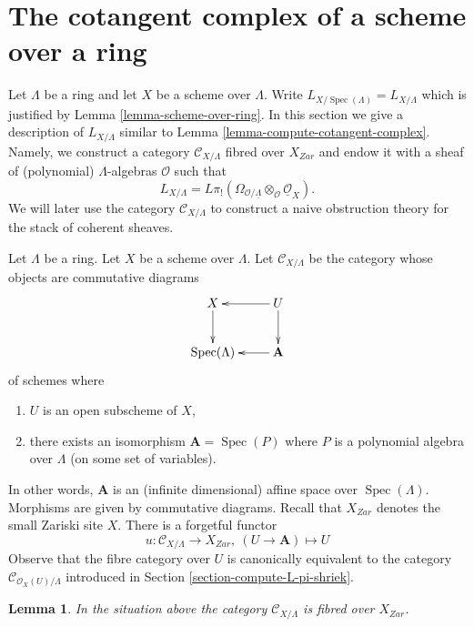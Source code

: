 \documentclass{stacks-project}
\theoremstyle{plain}
\newtheorem{lemma}[subsection]{Lemma}
\theoremstyle{definition}
\theoremstyle{remark}
\numberwithin{equation}{subsection}
\def\Spec{\mathop{\mathrm{Spec}}}
\begin{document}
\section{The cotangent complex of a scheme over a ring}
\label{section-cotangent-schemes-variant}

\noindent
Let $\Lambda$ be a ring and let $X$ be a scheme over $\Lambda$.
Write $L_{X/\Spec(\Lambda)} = L_{X/\Lambda}$ which is justified
by Lemma \ref{lemma-scheme-over-ring}.
In this section we give a description of $L_{X/\Lambda}$ similar to
Lemma \ref{lemma-compute-cotangent-complex}.
Namely, we construct a category $\mathcal{C}_{X/\Lambda}$
fibred over $X_{Zar}$ and endow it with a sheaf of (polynomial)
$\Lambda$-algebras $\mathcal{O}$ such that
$$
L_{X/\Lambda} =
L\pi_!(\Omega_{\mathcal{O}/\underline{\Lambda}} \otimes_\mathcal{O}
\underline{\mathcal{O}}_X).
$$
We will later use the category $\mathcal{C}_{X/\Lambda}$ to construct
a naive obstruction theory for the stack of coherent sheaves.

\medskip\noindent
Let $\Lambda$ be a ring. Let $X$ be a scheme over $\Lambda$.
Let $\mathcal{C}_{X/\Lambda}$ be the category whose objects are
commutative diagrams
\begin{equation}
\label{equation-object}
\vcenter{
\xymatrix{
X \ar[d] & U \ar[l] \ar[d] \\
\Spec(\Lambda) & \mathbf{A} \ar[l]
}
}
\end{equation}
of schemes where
\begin{enumerate}
\item $U$ is an open subscheme of $X$,
\item there exists an isomorphism $\mathbf{A} = \Spec(P)$
where $P$ is a polynomial algebra over $\Lambda$ (on some set
of variables).
\end{enumerate}
In other words, $\mathbf{A}$ is an (infinite dimensional) affine space over
$\Spec(\Lambda)$. Morphisms are given by commutative diagrams.
Recall that $X_{Zar}$ denotes the small Zariski site $X$.
There is a forgetful functor
$$
u : \mathcal{C}_{X/\Lambda} \to X_{Zar},\ (U \to \mathbf{A}) \mapsto U
$$
Observe that the fibre category over $U$ is canonically equivalent
to the category $\mathcal{C}_{\mathcal{O}_X(U)/\Lambda}$ introduced
in Section \ref{section-compute-L-pi-shriek}.

\begin{lemma}
\label{lemma-category-fibred}
In the situation above the category
$\mathcal{C}_{X/\Lambda}$ is fibred over $X_{Zar}$.
\end{lemma}
\end{document}
